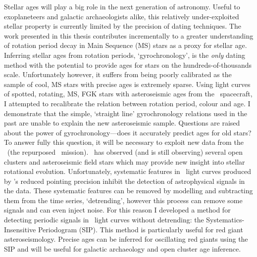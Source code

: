 %
%
%

Stellar ages will play a big role in the next generation of astronomy.
Useful to exoplaneteers and galactic archaeologists alike, this relatively
under-exploited stellar property is currently limited by the precision of
dating techniques.
The work presented in this thesis contributes incrementally to a greater
understanding of rotation period decay in Main Sequence (MS) stars as a proxy
for stellar age.
Inferring stellar ages from rotation periods, `gyrochronology', is the {\it
only} dating method with the potential to provide ages for stars on the
hundreds-of-thousands scale.
Unfortunately however, it suffers from being poorly calibrated as the sample
of cool, MS stars with precise ages is extremely sparse.
Using light curves of spotted, rotating, MS, FGK stars with asteroseismic ages
from the \kepler\ spacecraft, I attempted to recalibrate the relation between
rotation period, colour and age.
I demonstrate that the simple, `straight line' gyrochronology relations used
in the past are unable to explain the new asteroseismic sample.
Questions are raised about the power of gyrochronology---does it accurately
predict ages for old stars?
To answer fully this question, it will be necessary to exploit new data from
the \ktwo\ (the repurposed \kepler\ mission).
\ktwo\ has observed (and is still observing) several open clusters and
asteroseismic field stars which may provide new insight into stellar
rotational evolution.
Unfortunately, systematic features in \ktwo\ light curves produced by
\kepler's reduced pointing precision inhibit the detection of astrophysical
signals in the data.
These systematic features can be removed by modelling and subtracting them
from the time series, `detrending', however this process can remove some
signals and can even inject noise.
For this reason I developed a method for detecting periodic signals in \ktwo\
light curves without detrending: the Systematics-Insensitive Periodogram
(SIP).
This method is particularly useful for red giant asteroseismology.
Precise ages can be inferred for oscillating red giants using the SIP and will
be useful for galactic archaeology and open cluster age inference.

